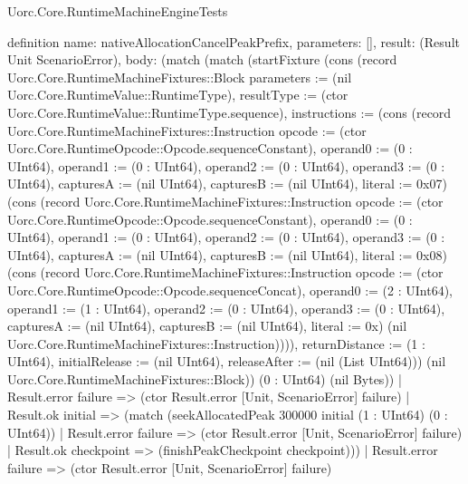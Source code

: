 \begin{lexlean}{Uorc.Core.RuntimeMachineEngineTests}
\begin{semanticmodule}
definition{
  name: nativeAllocationCancelPeakPrefix,
  parameters: [],
  result: (Result Unit ScenarioError),
  body: (match (match (startFixture (cons (record Uorc.Core.RuntimeMachineFixtures::Block {parameters := (nil Uorc.Core.RuntimeValue::RuntimeType), resultType := (ctor Uorc.Core.RuntimeValue::RuntimeType.sequence), instructions := (cons (record Uorc.Core.RuntimeMachineFixtures::Instruction {opcode := (ctor Uorc.Core.RuntimeOpcode::Opcode.sequenceConstant), operand0 := (0 : UInt64), operand1 := (0 : UInt64), operand2 := (0 : UInt64), operand3 := (0 : UInt64), capturesA := (nil UInt64), capturesB := (nil UInt64), literal := 0x07}) (cons (record Uorc.Core.RuntimeMachineFixtures::Instruction {opcode := (ctor Uorc.Core.RuntimeOpcode::Opcode.sequenceConstant), operand0 := (0 : UInt64), operand1 := (0 : UInt64), operand2 := (0 : UInt64), operand3 := (0 : UInt64), capturesA := (nil UInt64), capturesB := (nil UInt64), literal := 0x08}) (cons (record Uorc.Core.RuntimeMachineFixtures::Instruction {opcode := (ctor Uorc.Core.RuntimeOpcode::Opcode.sequenceConcat), operand0 := (2 : UInt64), operand1 := (1 : UInt64), operand2 := (0 : UInt64), operand3 := (0 : UInt64), capturesA := (nil UInt64), capturesB := (nil UInt64), literal := 0x}) (nil Uorc.Core.RuntimeMachineFixtures::Instruction)))), returnDistance := (1 : UInt64), initialRelease := (nil UInt64), releaseAfter := (nil (List UInt64))}) (nil Uorc.Core.RuntimeMachineFixtures::Block)) (0 : UInt64) (nil Bytes))
      | Result.error failure => (ctor Result.error [Unit, ScenarioError] failure)
      | Result.ok initial => (match (seekAllocatedPeak 300000 initial (1 : UInt64) (0 : UInt64))
        | Result.error failure => (ctor Result.error [Unit, ScenarioError] failure)
        | Result.ok checkpoint => (finishPeakCheckpoint checkpoint)))
    | Result.error failure => (ctor Result.error [Unit, ScenarioError] failure)
}
\end{semanticmodule}
\end{lexlean}
